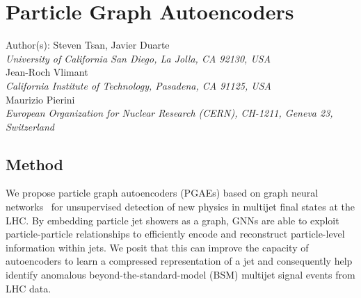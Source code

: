 \documentclass[letterpaper,11pt]{article}
\begin{document}
\section*{Particle Graph Autoencoders}
Author(s): Steven Tsan, Javier Duarte \\ 
\textit{University of California San Diego, La Jolla, CA 92130, USA}\\
Jean-Roch Vlimant\\
\textit{California Institute of Technology, Pasadena, CA 91125, USA}\\
Maurizio Pierini\\
\textit{European Organization for Nuclear Research (CERN), CH-1211, Geneva 23, Switzerland}


\subsection{Method}
\label{sec:method}


We propose particle graph autoencoders (PGAEs) based on graph neural networks~\cite{Shlomi:2020gdn} for unsupervised detection of new physics in multijet final states at the LHC. 
By embedding particle jet showers as a graph, GNNs are able to exploit particle-particle relationships to efficiently encode and reconstruct particle-level information within jets.
We posit that this can improve the capacity of autoencoders to learn a compressed representation of a jet and consequently help identify anomalous beyond-the-standard-model (BSM) multijet signal events from LHC data.
\end{document}

